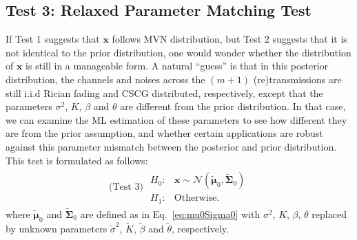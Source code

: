 \documentclass[journal,draftcls,onecolumn,12pt,twoside]{IEEEtran}
\begin{document}
\subsection{Test 3: Relaxed Parameter Matching Test}
If Test 1 suggests that $\mathbf{x}$ follows MVN
distribution, but Test 2 suggests that it is not identical to
the prior distribution, one would wonder whether the distribution of
$\mathbf{x}$ is still in a manageable form. A natural ``guess'' is that in this
posterior distribution, the channels and noises across the $(m+1)$
(re)transmissions are still i.i.d Rician fading and CSCG distributed,
respectively, except that the parameters $\sigma^2$, $K$, $\beta$ and $\theta$
are different from the prior distribution. In that case, we can examine the
ML estimation of these parameters to see how different they are
from the prior assumption, and whether certain applications are robust against
this parameter mismatch between the posterior and prior distribution. This test
is formulated as follows:
\begin{align}
  \mbox{(Test 3) } \begin{array}{ll}H_0: & \mathbf{x}\sim
  \mathcal{N}(\tilde{\bm{\mu}}_0, \tilde{\mathbf{\Sigma}}_0)
  \\
  H_1:
  &
  \mbox{Otherwise.}
  \end{array}
\end{align}
where $\tilde{\bm{\mu}}_0$ and $\tilde{\mathbf{\Sigma}}_0$ are defined as in
Eq.~\eqref{eq:mu0Sigma0} with $\sigma^2$, $K$, $\beta$, $\theta$ replaced by
unknown parameters $\tilde{\sigma}^2$, $\tilde{K}$, $\tilde{\beta}$ and
$\tilde{\theta}$, respectively.
\end{document}
